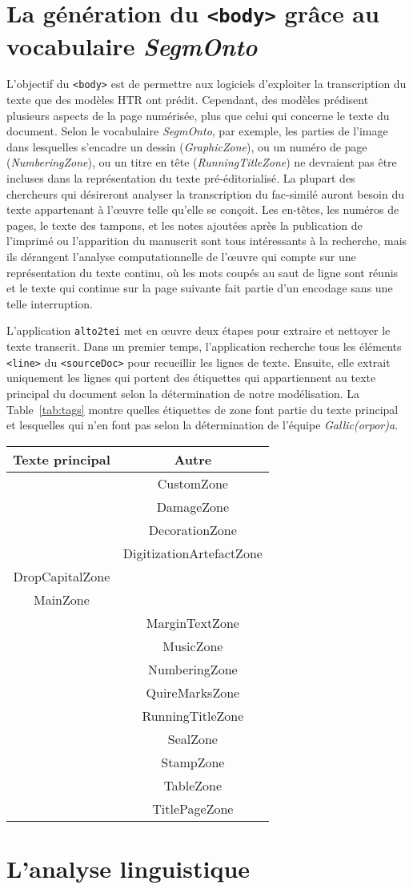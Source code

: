 \documentclass[class=article, crop=false]{standalone}
\begin{document}
\section{La génération du \texttt{<body>} grâce au vocabulaire \textit{SegmOnto}}
L'objectif du \texttt{<body>} est de permettre aux logiciels d'exploiter la transcription du texte que des modèles \acrshort{HTR} ont prédit. Cependant, des modèles prédisent plusieurs aspects de la page numérisée, plus que celui qui concerne le texte du document. Selon le vocabulaire \textit{SegmOnto}, par exemple, les parties de l'image dans lesquelles s'encadre un dessin (\textit{GraphicZone}), ou un numéro de page (\textit{NumberingZone}), ou un titre en tête (\textit{RunningTitleZone}) ne devraient pas être incluses dans la représentation du texte pré-éditorialisé. La plupart des chercheurs qui désireront analyser la transcription du fac-similé auront besoin du texte appartenant à l'œuvre telle qu'elle se conçoit. Les en-têtes, les numéros de pages, le texte des tampons, et les notes ajoutées après la publication de l'imprimé ou l'apparition du manuscrit sont tous intéressants à la recherche, mais ils dérangent l'analyse computationnelle de l'œuvre qui compte sur une représentation du texte continu, où les mots coupés au saut de ligne sont réunis et le texte qui continue sur la page suivante fait partie d'un encodage sans une telle interruption.

L'application \texttt{alto2tei} met en œuvre deux étapes pour extraire et nettoyer le texte transcrit. Dans un premier temps, l'application recherche tous les éléments \texttt{<line>} du \texttt{<sourceDoc>} pour recueillir les lignes de texte. Ensuite, elle extrait uniquement les lignes qui portent des étiquettes qui appartiennent au texte principal du document selon la détermination de notre modélisation. La Table~\ref{tab:tags} montre quelles étiquettes de zone font partie du texte principal et lesquelles qui n'en font pas selon la détermination de l'équipe \textit{Gallic(orpor)a}.

\centering
\begin{tabularx}{0.5\textwidth}
	{|  c | c | }
\hline
Texte principal & Autre \\
\hline \hline
 & CustomZone \\ \hline
 & DamageZone \\ \hline
 & DecorationZone \\ \hline
 & DigitizationArtefactZone\\ \hline
DropCapitalZone & \\ \hline
MainZone & \\ \hline
 & MarginTextZone\\ \hline
 & MusicZone\\ \hline
 & NumberingZone\\ \hline
 & QuireMarksZone\\ \hline
 & RunningTitleZone\\ \hline
 & SealZone\\ \hline
 & StampZone\\ \hline
 & TableZone\\ \hline
 & TitlePageZone\\ \hline
\end{tabularx}
\label{tab:tags}

\section{L'analyse linguistique}
\end{document}
